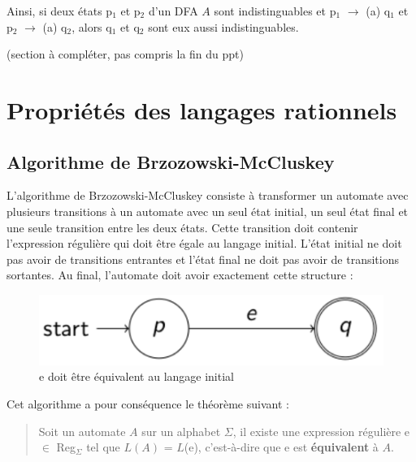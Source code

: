 \documentclass{article}
\begin{document}
Ainsi, si deux états p$_{1}$ et p$_{2}$ d'un DFA $A$ sont indistinguables et p$_{1}$ $\rightarrow$ (a) q$_{1}$ et p$_{2}$ $\rightarrow$ (a) q$_{2}$, alors q$_{1}$ et q$_{2}$ sont eux aussi indistinguables.

(section à compléter, pas compris la fin du ppt)

\newpage
















\section{Propriétés des langages rationnels}
\subsection{Algorithme de Brzozowski-McCluskey}
L'algorithme de Brzozowski-McCluskey consiste à transformer un automate avec plusieurs transitions à un automate avec un seul état initial, un seul état final et une seule transition entre les deux états. Cette transition doit contenir l'expression régulière qui doit être égale au langage initial. L'état initial ne doit pas avoir de transitions entrantes et l'état final ne doit pas avoir de transitions sortantes. Au final, l'automate doit avoir exactement cette structure :
\begin{figure}[h]
    \centering
    \includegraphics[scale=0.5]{Image17.png}
    \caption{e doit être équivalent au langage initial}
\end{figure}

Cet algorithme a pour conséquence le théorème suivant :
\begin{quote}
    Soit un automate $A$ sur un alphabet $\Sigma$, il existe une expression régulière e $\in$ Reg$_{\Sigma}$ tel que $L(A)$ = $L$(e), c'est-à-dire que e est \textbf{équivalent} à $A$.
\end{quote}
\end{document}
